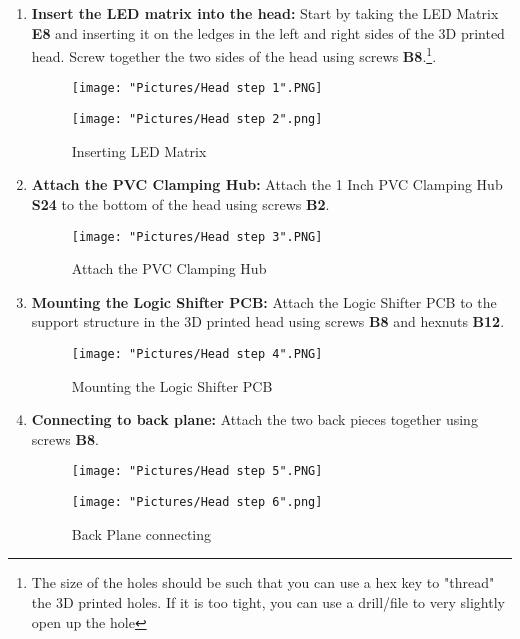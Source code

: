\documentclass[12pt]{article}
\begin{document}
\begin{enumerate}

	\item \textbf{Insert the LED matrix into the head:} Start by taking the LED Matrix \textbf{E8} and inserting it on the ledges in the left and right sides of the 3D printed head. Screw together the two sides of the head using screws \textbf{B8}.\footnote{The size of the holes should be such that you can use a hex key to "thread" the 3D printed holes. If it is too tight, you can use a drill/file to very slightly open up the hole}.


\begin{figure}[H]
	\centering
  	\begin{minipage}[b]{0.45\textwidth}
		\texttt{[image: "Pictures/Head step 1".PNG]}
  	\end{minipage}
  	\hfill
  	\begin{minipage}[b]{0.45\textwidth}
    		\texttt{[image: "Pictures/Head step 2".png]}
  	\end{minipage}
  	\caption{Inserting LED Matrix}
  	\label{LED}
\end{figure}

	\item \textbf{Attach the PVC  Clamping Hub:} Attach the 1 Inch PVC Clamping Hub \textbf{S24} to the bottom of the head using screws \textbf{B2}. 

\begin{figure}[H]
	\centering
	\texttt{[image: "Pictures/Head step 3".PNG]}
	\caption{Attach the PVC Clamping Hub}
\end{figure}

	\item \textbf{Mounting the Logic Shifter PCB:} Attach the Logic Shifter PCB to the support structure in the 3D printed head using screws \textbf{B8} and hexnuts \textbf{B12}. 

\begin{figure}[H]
	\centering
	\texttt{[image: "Pictures/Head step 4".PNG]}
	\caption{Mounting the Logic Shifter PCB}
\end{figure}

	\item \textbf{Connecting to back plane:} Attach the two back pieces together using screws \textbf{B8}. 

\begin{figure}[H]
	\centering
  	\begin{minipage}[b]{0.45\textwidth}
		\texttt{[image: "Pictures/Head step 5".PNG]}
  	\end{minipage}
  	\hfill
  	\begin{minipage}[b]{0.45\textwidth}
    		\texttt{[image: "Pictures/Head step 6".png]}
  	\end{minipage}
  	\caption{Back Plane connecting}
  	\label{back}
\end{figure}


\end{enumerate}
\end{document}

